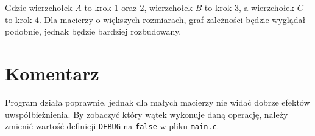 \documentclass[11pt]{article}
\begin{document}
Gdzie wierzchołek $A$ to krok 1 oraz 2, wierzchołek $B$ to krok 3,
a wierzchołek $C$ to krok 4. Dla macierzy o większych rozmiarach,
graf zależności będzie wyglądał podobnie, jednak będzie bardziej rozbudowany.
\section{Komentarz}
Program działa poprawnie, jednak dla małych macierzy nie widać dobrze efektów
uwspółbieżnienia. By zobaczyć który wątek wykonuje daną operację, należy zmienić
wartość definicji \texttt{DEBUG} na \texttt{false} w pliku \texttt{main.c}.
\end{document}
